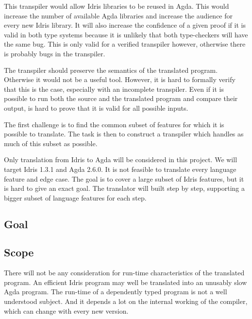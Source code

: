 \documentclass[parskip=half]{scrartcl}
\begin{document}
This transpiler would allow Idris libraries to be reused in Agda. This would
increase the number of available Agda libraries and increase
the audience for every new Idris library.  It will also increase the confidence
of a given proof if it is valid in both type systems because it is unlikely
that both type-checkers will have the same bug. This is only valid for
a verified transpiler however, otherwise there is probably bugs in the
transpiler.

The transpiler should preserve the semantics of the translated program.
Otherwise it would not be a useful tool. However, it is hard to formally verify
that this is the case, especially with an incomplete transpiler. Even if it is
possible to run both the source and the translated program and compare their
output, is hard to prove that it is valid for all possible inputs.

The first challenge is to find the common subset of features for which it is
possible to translate. The task is then to construct a transpiler which handles
as much of this subset as possible.

Only translation from Idris to Agda will be considered in this project. We will
target Idris 1.3.1 and Agda 2.6.0. It is not feasible to translate every
language feature and edge case.  The goal is to cover a large subset of Idris
features, but it is hard to give an exact goal.  The translator will built step
by step, supporting a bigger subset of language features for each step.

\subsection{Goal}


\subsection{Scope}
There will not be any consideration for run-time characteristics of the
translated program. An efficient Idris program may well be translated into an
unusably slow Agda program. The run-time of a dependently typed program is not
a well understood subject. And it depends a lot on the internal working of the
compiler, which can change with every new version.
\end{document}
